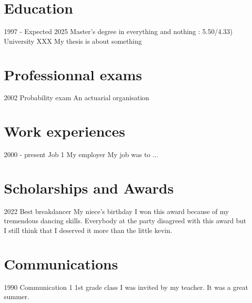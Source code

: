 \documentclass{article}
\begin{document}
\vspace{14pt}


\section{Education}


\cvevent
{1997 - Expected 2025}
{Master's degree in everything and nothing : 5.50/4.33)}
{University XXX }
{My thesis is about something}{}{}{}




\section{Professionnal exams}


\cvevent
 {2002}
 {Probability exam}
 {An actuarial organisation}
 {}{}{}{}



\section{Work experiences}


\cvevent
 {2000 - present}
 {Job 1}
 {My employer}
 {My job was to ... }{}{}{}



\section{Scholarships and Awards}

\cvevent
 {2022}
 {Best breakdancer}
 {My niece's birthday}
 {I won this award because of my tremendous dancing skills. Everybody at the party disagreed with this award but I still think that I deserved it more than the little kevin.}{}{}{}


\section{Communications}

\cvevent
 {1990}
 {Communication 1}
 {1st grade class}
 {I was invited by my teacher. It was a great summer. }{}{}{}
\end{document}
